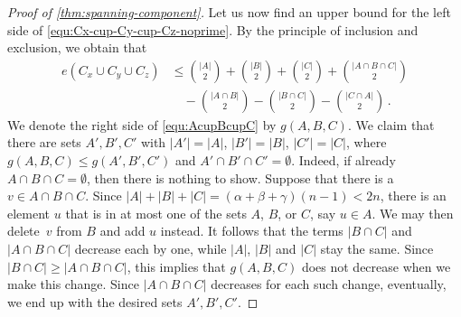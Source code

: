 \documentclass[10pt,a4paper]{amsart}
\newcommand{\abs}[1]{\left\lvert#1\right\rvert}
\newcommand{\al}{\alpha}
\newcommand{\be}{\beta}
\newcommand{\ce}{\gamma}
\begin{document}
\begin{proof}[Proof of \cref{thm:spanning-component}]
		Let us now find an upper bound for the left side of \eqref{equ:Cx-cup-Cy-cup-Cz-noprime}.
		By the principle of inclusion and exclusion, we obtain that
		\begin{align}
			e(C_x \cup C_y \cup C_z) &\leq \binom{|A|}{2} + \binom{|B|}{2} + \binom{|C|}{2} +  \binom{|A \cap B \cap C|}{2}  \nonumber \\ 
			&\quad - \binom{|A \cap B|}{2} - \binom{|B \cap C|}{2} - \binom{|C \cap A|}{2} \,. \label{equ:AcupBcupC}
		\end{align}
		We denote the right side of \eqref{equ:AcupBcupC} by $g(A,B,C)$. We claim that there are sets $A',B',C'$ with $\abs{A'}=\abs{A}$, $\abs{B'}=\abs{B}$, $\abs{C'}=\abs{C}$, where $g(A,B,C)\le g(A',B',C')$ and $A'\cap B'\cap C'=\emptyset$. Indeed, if already $A\cap B\cap C=\emptyset$, then there is nothing to show. Suppose that there is a $v \in A \cap B \cap C$.
		Since $\abs{A} + \abs{B} + \abs{C} =(\al+\be+\ce)(n-1)< 2n$, there is an element $u$ that is in at most one of the sets $A$, $B$, or $C$, say $u \in A$.
		We may then delete~$v$ from $B$ and add $u$ instead.
		It follows that the terms $|B \cap C|$ and $|A \cap B \cap C|$ decrease each by one, while $|A|$, $|B|$ and $|C|$ stay the same.
		Since $|B \cap C| \geq |A \cap B \cap C|$, this implies that $g(A,B,C)$ does not decrease when we make this change. Since $\abs{A\cap B\cap C}$ decreases for each such change, eventually, we end up with the desired sets $A',B',C'$.
		

\end{proof}
\end{document}
